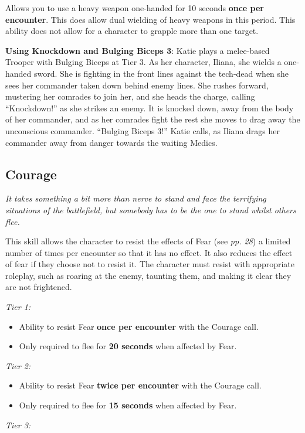 \documentclass{scrbook}
\begin{document}
Allows you to use a heavy weapon one-handed for 10 seconds \textbf{once per encounter}. This does allow dual wielding of heavy weapons in this period. This ability does not allow for a character to grapple more than one target.

\textbf{Using Knockdown and Bulging Biceps 3}: Katie plays a melee-based Trooper with Bulging Biceps at Tier 3. As her character, Iliana, she wields a one-handed sword. She is fighting in the front lines against the tech-dead when she sees her commander taken down behind enemy lines. She rushes forward, mustering her comrades to join her, and she heads the charge, calling ``Knockdown!'' as she strikes an enemy. It is knocked down, away from the body of her commander, and as her comrades fight the rest she moves to drag away the unconscious commander. ``Bulging Biceps 3!'' Katie calls, as Iliana drags her commander away from danger towards the waiting Medics.

\subsection{Courage}

\textit{It takes something a bit more than nerve to stand and face the terrifying situations of the battlefield, but somebody has to be the one to stand whilst others flee.}

This skill allows the character to resist the effects of Fear (see \textit{pp. 28}) a limited number of times per encounter so that it has no effect. It also reduces the effect of fear if they choose not to resist it. The character must resist with appropriate roleplay, such as roaring at the enemy, taunting them, and making it clear they are not frightened.

\textit{Tier 1:}

\begin{itemize}
\item Ability to resist Fear \textbf{once per encounter} with the Courage call.

\item Only required to flee for \textbf{20 seconds} when affected by Fear.

\end{itemize}
\textit{Tier 2:}

\begin{itemize}
\item Ability to resist Fear \textbf{twice per encounter} with the Courage call.

\item Only required to flee for \textbf{15 seconds} when affected by Fear.

\end{itemize}
\textit{Tier 3:}
\end{document}
